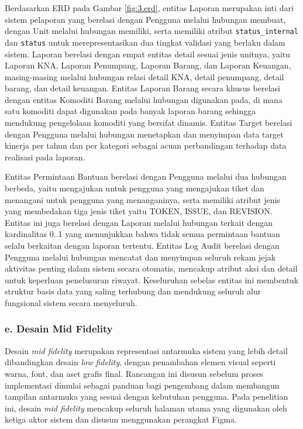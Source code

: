 Berdasarkan ERD pada Gambar \ref{fig:3.erd}, entitas Laporan merupakan inti dari sistem pelaporan yang berelasi dengan Pengguna melalui hubungan membuat, dengan Unit melalui hubungan memiliki, serta memiliki atribut \texttt{status\_internal} dan \texttt{status} untuk merepresentasikan dua tingkat validasi yang berlaku dalam sistem. Laporan berelasi dengan empat entitas detail sesuai jenis unitnya, yaitu Laporan KNA, Laporan Penumpang, Laporan Barang, dan Laporan Keuangan, masing-masing melalui hubungan relasi detail KNA, detail penumpang, detail barang, dan detail keuangan. Entitas Laporan Barang secara khusus berelasi dengan entitas Komoditi Barang melalui hubungan digunakan pada, di mana satu komoditi dapat digunakan pada banyak laporan barang sehingga mendukung pengelolaan komoditi yang bersifat dinamis. Entitas Target berelasi dengan Pengguna melalui hubungan menetapkan dan menyimpan data target kinerja per tahun dan per kategori sebagai acuan perbandingan terhadap data realisasi pada laporan. \par


Entitas Permintaan Bantuan berelasi dengan Pengguna melalui dua hubungan berbeda, yaitu mengajukan untuk pengguna yang mengajukan tiket dan menangani untuk pengguna yang menanganinya, serta memiliki atribut jenis yang membedakan tiga jenis tiket yaitu TOKEN, ISSUE, dan REVISION. Entitas ini juga berelasi dengan Laporan melalui hubungan terkait dengan kardinalitas 0..1 yang menunjukkan bahwa tidak semua permintaan bantuan selalu berkaitan dengan laporan tertentu. Entitas Log Audit berelasi dengan Pengguna melalui hubungan mencatat dan menyimpan seluruh rekam jejak aktivitas penting dalam sistem secara otomatis, mencakup atribut aksi dan detail untuk keperluan penelusuran riwayat. Keseluruhan sebelas entitas ini membentuk struktur basis data yang saling terhubung dan mendukung seluruh alur fungsional sistem secara menyeluruh. \par

\subsubsection*{e. Desain Mid Fidelity}
Desain \textit{mid fidelity} merupakan representasi antarmuka sistem yang lebih detail dibandingkan desain \textit{low fidelity}, dengan penambahan elemen visual seperti warna, font, dan aset grafis final. Rancangan ini disusun sebelum proses implementasi dimulai sebagai panduan bagi pengembang dalam membangun tampilan antarmuka yang sesuai dengan kebutuhan pengguna. Pada penelitian ini, desain \textit{mid fidelity} mencakup seluruh halaman utama yang digunakan oleh ketiga aktor sistem dan disusun menggunakan perangkat Figma.

